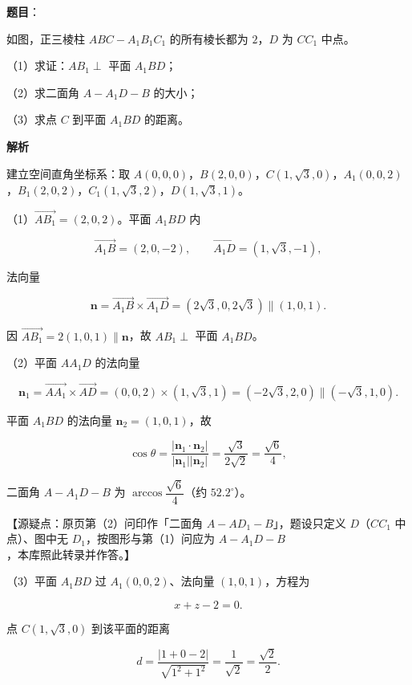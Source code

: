 \begin{answer}

\textbf{题目}：

如图，正三棱柱 $ABC-A_1B_1C_1$ 的所有棱长都为 $2$，$D$ 为 $CC_1$ 中点。

（1）求证：$AB_1\perp$ 平面 $A_1BD$；

（2）求二面角 $A-A_1D-B$ 的大小；

（3）求点 $C$ 到平面 $A_1BD$ 的距离。
\nopagebreak[4]
\begin{center}\end{center}
\nopagebreak[4]
\textbf{解析}

建立空间直角坐标系：取 $A(0,0,0)$，$B(2,0,0)$，$C(1,\sqrt3,0)$，$A_1(0,0,2)$，$B_1(2,0,2)$，$C_1(1,\sqrt3,2)$，$D(1,\sqrt3,1)$。

（1）$\overrightarrow{AB_1}=(2,0,2)$。平面 $A_1BD$ 内

\nopagebreak[4]
\[\overrightarrow{A_1B}=(2,0,-2),\qquad \overrightarrow{A_1D}=(1,\sqrt3,-1),\]

法向量

\nopagebreak[4]
\[\boldsymbol n=\overrightarrow{A_1B}\times\overrightarrow{A_1D}=\left(2\sqrt3,0,2\sqrt3\right)\parallel(1,0,1).\]

因 $\overrightarrow{AB_1}=2(1,0,1)\parallel\boldsymbol n$，故 $AB_1\perp$ 平面 $A_1BD$。

（2）平面 $AA_1D$ 的法向量

\nopagebreak[4]
\[\boldsymbol n_1=\overrightarrow{AA_1}\times\overrightarrow{AD}=(0,0,2)\times(1,\sqrt3,1)=\left(-2\sqrt3,2,0\right)\parallel\left(-\sqrt3,1,0\right).\]

平面 $A_1BD$ 的法向量 $\boldsymbol n_2=(1,0,1)$，故

\nopagebreak[4]
\[\cos\theta=\frac{\left|\boldsymbol n_1\cdot\boldsymbol n_2\right|}{\left|\boldsymbol n_1\right|\left|\boldsymbol n_2\right|}=\frac{\sqrt3}{2\sqrt2}=\frac{\sqrt6}4,\]

二面角 $A-A_1D-B$ 为 $\arccos\dfrac{\sqrt6}4$（约 $52.2^\circ$）。

【源疑点：原页第（2）问印作「二面角 $A-AD_1-B$」，题设只定义 $D$（$CC_1$ 中点）、图中无 $D_1$，按图形与第（1）问应为 $A-A_1D-B$，本库照此转录并作答。】

（3）平面 $A_1BD$ 过 $A_1(0,0,2)$、法向量 $(1,0,1)$，方程为

\nopagebreak[4]
\[x+z-2=0.\]

点 $C(1,\sqrt3,0)$ 到该平面的距离

\nopagebreak[4]
\[d=\frac{|1+0-2|}{\sqrt{1^2+1^2}}=\frac1{\sqrt2}=\frac{\sqrt2}2.\]


\end{answer}
